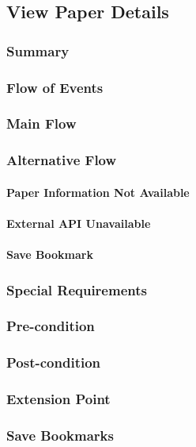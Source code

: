 \subsection{View Paper Details}
\subsubsection{Summary}

\subsubsection{Flow of Events}
\subsubsection*{Main Flow}

\subsubsection*{Alternative Flow}
\paragraph{Paper Information Not Available}

\paragraph{External API Unavailable}

\paragraph{Save Bookmark}

\subsubsection{Special Requirements}

\subsubsection{Pre-condition}

\subsubsection{Post-condition}

\subsubsection{Extension Point}
\subsubsection*{Save Bookmarks}